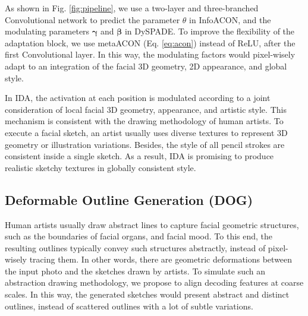 \documentclass[10pt,twocolumn,letterpaper]{article}
\begin{document}



 
As shown in Fig. \ref{fig:pipeline}, we use a two-layer and three-branched Convolutional network to predict the parameter $\theta$ in InfoACON, and the modulating parameters $\bm{\gamma}$ and $\bm{\beta}$ in DySPADE. To improve the flexibility of the adaptation block, we use metaACON (Eq. \ref{eq:acon}) \cite{ma2021acon} instead of ReLU, after the first Convolutional layer. In this way, the modulating factors would pixel-wisely adapt to an integration of the facial 3D geometry, 2D appearance, and global style.  

In IDA, the activation at each position is modulated according to a joint consideration of local facial 3D geometry, appearance, and artistic style. This mechanism is consistent with the drawing methodology of human artists. To execute a facial sketch, an artist usually uses diverse textures to represent 3D geometry or illustration variations. Besides, the style of all pencil strokes are consistent inside a single sketch. As a result, IDA is promising to produce realistic sketchy textures in globally consistent style. 



\subsection{Deformable Outline Generation (DOG)}
\label{ssec:dfa}

Human artists usually draw abstract lines to capture facial geometric structures, such as the boundaries of facial organs, and facial mood. To this end, the resulting outlines typically convey such structures abstractly, instead of pixel-wisely tracing them. In other words, there are geometric deformations between the input photo and the sketches drawn by artists. 
To simulate such an abstraction drawing methodology, we propose to align decoding features at coarse scales. In this way, the generated sketches would present abstract and distinct outlines, instead of scattered outlines with a lot of subtle variations.
 
\end{document}
